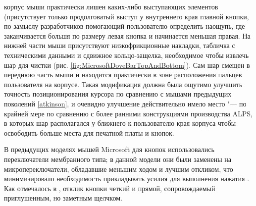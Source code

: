 \documentclass[11pt, a4paper]{article}
\begin{document}
корпус мыши практически лишен каких-либо выступающих элементов (присутствует только продолговатый выступ у внутреннего края главной кнопки, по замыслу разработчиков помогающий пользователю определить наощупь, где заканчивается большя по размеру левая кнопка и начинается меньшая правая.
     На нижней части мыши присутствуют низкофрикционные накладки, табличка с техническими данными и сдвижное кольцо-защелка, необходимое чтобы извлечь шар для чистки (рис. \ref{fig:MicrosoftDoveBarTopAndBottom}). 
     Сам шар смещен в переднюю часть мыши и находится практически в зоне расположения пальцев пользователя на корпусе. Такая модификация должна была ощутимо улучшить точность позиционирования курсора по сравнению с мышами предыдущих поколений \ref{atkinson}, и очевидно улучшение действительно имело место "--- по крайней мере по сравнению с более ранними конструкциями производства ALPS, в которых шар располагался у ближнего к пользователю края корпуса чтобы освободить больше места для печатной платы и кнопок.

В предыдущих моделях мышей Microsoft для кнопок использовались переключатели мембранного типа; в данной модели они были заменены на микропереключатели, обладавшие меньшим ходом и лучшим откликом, что минимизировало необходимость прикладывать усилия для выполнения нажатия \cite{doveBarDesign2}. Как отмечалось в \cite{doveBarMousePcMag3}, отклик кнопки четкий и прямой, сопровождаемый приглушенным, но заметным щелчком. 
\end{document}
